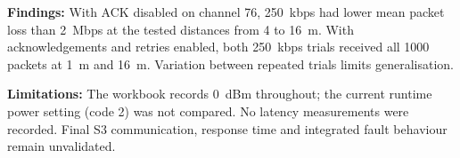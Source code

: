 \noindent
\textbf{Findings:}
With ACK disabled on channel 76, 250~kbps had lower mean
packet loss than 2~Mbps at the tested distances from
4 to 16~m. With acknowledgements and retries enabled,
both 250~kbps trials received all 1000 packets at
1~m and 16~m. Variation between repeated trials limits
generalisation.
\cite{reii_measurements2026}

\noindent
\textbf{Limitations:}
The workbook records 0~dBm throughout; the current
runtime power setting (code 2) was not compared.
No latency measurements were recorded. Final S3
communication, response time and integrated fault
behaviour remain unvalidated.